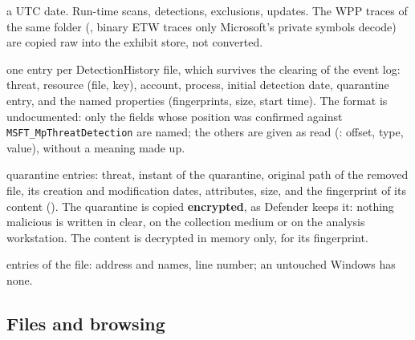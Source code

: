 \documentclass[11pt,a4paper,oneside]{report}
\begin{document}
\begin{description}[style=nextline,leftmargin=1.2em]
        a UTC date. Run-time scans, detections, exclusions, updates. The WPP
        traces of the same folder (, binary ETW traces only
        Microsoft's private symbols decode) are copied raw into the exhibit
        store, not converted.
  \item[\fichier{defender\_detections.json}] one entry per DetectionHistory
        file, which survives the clearing of the event log: threat, resource
        (file, key), account, process, initial detection date, quarantine
        entry, and the named  properties (fingerprints,
        size, start time). The format is undocumented: only the fields whose
        position was confirmed against \texttt{MSFT\_MpThreatDetection} are
        named; the others are given as read (: offset,
        type, value), without a meaning made up.
  \item[\fichier{defender\_quarantine.json}] quarantine entries: threat,
        instant of the quarantine, original path of the removed file, its
        creation and modification dates, attributes, size, and the
        fingerprint of its content (). The quarantine is
        copied \textbf{encrypted}, as Defender keeps it: nothing malicious is
        written in clear, on the collection medium or on the analysis
        workstation. The content is decrypted in memory only, for its
        fingerprint.
  \item[\fichier{hosts.json}] entries of the  file: address and
        names, line number; an untouched Windows has none.
\end{description}

\subsection{Files and browsing}
\end{document}
